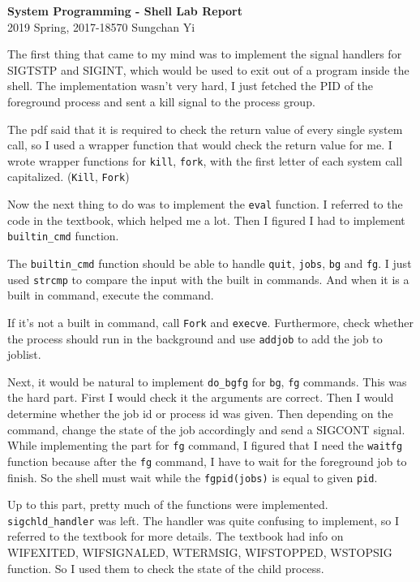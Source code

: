 \documentclass[12pt]{report}
\begin{document}
\begin{center}
\textbf{\Large System Programming - Shell Lab Report}\\
\large 2019 Spring, 2017-18570 Sungchan Yi
\end{center}

The first thing that came to my mind was to implement the signal handlers for SIGTSTP and SIGINT, which would be used to exit out of a program inside the shell. The implementation wasn't very hard, I just fetched the PID of the foreground process and sent a kill signal to the process group.

The pdf said that it is required to check the return value of every single system call, so I used a wrapper function that would check the return value for me. I wrote wrapper functions for \texttt{kill}, \texttt{fork}, with the first letter of each system call capitalized. (\texttt{Kill}, \texttt{Fork})

Now the next thing to do was to implement the \texttt{eval}  function. I referred to the code in the textbook, which helped me a lot. Then I figured I had to implement \texttt{builtin\_cmd} function.

The \texttt{builtin\_cmd} function should be able to handle \texttt{quit}, \texttt{jobs}, \texttt{bg} and \texttt{fg}. I just used \texttt{strcmp} to compare the input with the built in commands. And when it is a built in command, execute the command.

If it's not a built in command, call \texttt{Fork} and \texttt{execve}. Furthermore, check whether the process should run in the background and use \texttt{addjob} to add the job to joblist.

Next, it would be natural to implement \texttt{do\_bgfg} for \texttt{bg}, \texttt{fg} commands. This was the hard part. First I would check it the arguments are correct. Then I would determine whether the job id or process id was given. Then depending on the command, change the state of the job accordingly and send a SIGCONT signal. While implementing the part for \texttt{fg} command, I figured that I need the \texttt{waitfg} function because after the \texttt{fg} command, I have to wait for the foreground job to finish. So the shell must wait while the \texttt{fgpid(jobs)} is equal to given \texttt{pid}.

Up to this part, pretty much of the functions were implemented. \texttt{sigchld\_handler} was left. The handler was quite confusing to implement, so I referred to the textbook for more details. The textbook had info on WIFEXITED, WIFSIGNALED, WTERMSIG, WIFSTOPPED, WSTOPSIG function. So I used them to check the state of the child process.
\end{document}
